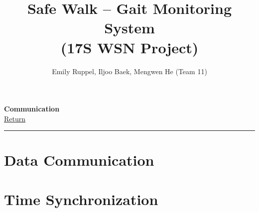 \documentclass[letterpaper,12pt]{article}
\title{\textbf{Safe Walk -- Gait Monitoring System\\\small (17S WSN Project)}}
\author{Emily Ruppel, Iljoo Baek, Mengwen He (Team 11)}
\newcommand{\panhline}{\begin{center}\rule{\textwidth}{1pt}\end{center}}
\begin{document}
\maketitle

\textbf{Communication}\\
\href{../index.html}{Return}
\panhline
\section{Data Communication}

\section{Time Synchronization}
\end{document}
